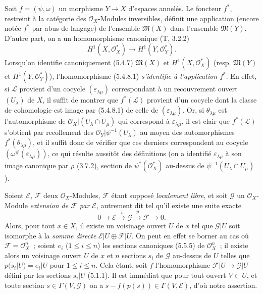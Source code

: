 \begin{env}[5.4.8]
\label{0.5.4.8-fr}
Soit $f=(\psi,\omega)$ un morphisme $Y\to X$ d'espaces annelés. Le foncteur
$f^*$, restreint à la catégorie des $\mathcal{O}_X$-Modules inversibles,
définit une application (encore notée $f^*$ par abus de langage) de l'ensemble
$\mathfrak{M}(X)$ dans l'ensemble $\mathfrak{M}(Y)$. D'autre part, on a un
homomorphisme canonique (T, 3.2.2)
\[
  H^1(X,\mathcal{O}_X^*)\longrightarrow H^1(Y,\mathcal{O}_Y^*).
  \tag{5.4.8.1}\label{0.5.4.8.1-fr}
\]
Lorsqu'on identifie canoniquement (5.4.7) $\mathfrak{M}(X)$ et
$H^1(X,\mathcal{O}_X^*)$ (resp. $\mathfrak{M}(Y)$ et
$H^1(Y,\mathcal{O}_Y^*)$), l'homomorphisme (5.4.8.1) \emph{s'identifie à
l'application $f^*$}. En effet, si $\mathcal{L}$ provient d'un cocycle
$(\varepsilon_{\lambda\mu})$ correspondant à un recouvrement ouvert
$(U_\lambda)$ de $X$, il suffit de montrer que $f^*(\mathcal{L})$ provient
d'un cocycle dont la classe de cohomologie est image par (5.4.8.1) de celle de
$(\varepsilon_{\lambda\mu})$. Or, si $\theta_{\lambda\mu}$ est
l'automorphisme de $\mathcal{O}_X|(U_\lambda\cap U_\mu)$ qui correspond à
$\varepsilon_{\lambda\mu}$, il est clair que $f^*(\mathcal{L})$ s'obtient par
recollement des $\mathcal{O}_Y|\psi^{-1}(U_\lambda)$ au moyen des
automorphismes $f^*(\theta_{\lambda\mu})$, et il suffit donc de vérifier que
ces derniers correspondent au cocycle
$(\omega^\#(\varepsilon_{\lambda\mu}))$, ce qui résulte aussitôt des
définitions (on a identifié $\varepsilon_{\lambda\mu}$ à son image canonique
par $\rho$ (3.7.2), section de $\psi^*(\mathcal{O}_X^*)$ au-dessus de
$\psi^{-1}(U_\lambda\cap U_\mu)$).
\end{env}

\begin{env}[5.4.9]
\label{0.5.4.9-fr}
Soient $\mathcal{E}$, $\mathcal{F}$ deux $\mathcal{O}_X$-Modules,
$\mathcal{F}$ étant supposé \emph{localement libre}, et soit $\mathcal{G}$ un
$\mathcal{O}_X$-Module \emph{extension de $\mathcal{F}$ par $\mathcal{E}$},
autrement dit tel qu'il existe une suite exacte
\[
  0\longrightarrow\mathcal{E}\xrightarrow{i}\mathcal{G}
  \xrightarrow{p}\mathcal{F}\longrightarrow 0.
\]
Alors, pour tout $x\in X$, il existe un voisinage ouvert $U$ de $x$ tel que
$\mathcal{G}|U$ soit isomorphe à la \emph{somme directe}
$\mathcal{E}|U\oplus\mathcal{F}|U$. On peut en effet se borner au cas où
$\mathcal{F}=\mathcal{O}_X^n$~; soient $e_i$ ($1\leq i\leq n$) les sections
canoniques (5.5.5) de $\mathcal{O}_X^n$~; il existe alors un voisinage ouvert
$U$ de $x$ et $n$ sections $s_i$ de $\mathcal{G}$ au-dessus de $U$ telles que
$p(s_i|U)=e_i|U$ pour $1\leq i\leq n$. Cela étant, soit $f$
l'homomorphisme $\mathcal{F}|U\to\mathcal{G}|U$ défini par les sections
$s_i|U$ (5.1.1). Il est immédiat que pour tout ouvert $V\subset U$, et toute
section $s\in\Gamma(V,\mathcal{G})$ on a
$s-f(p(s))\in\Gamma(V,\mathcal{E})$, d'où notre assertion.
\end{env}

